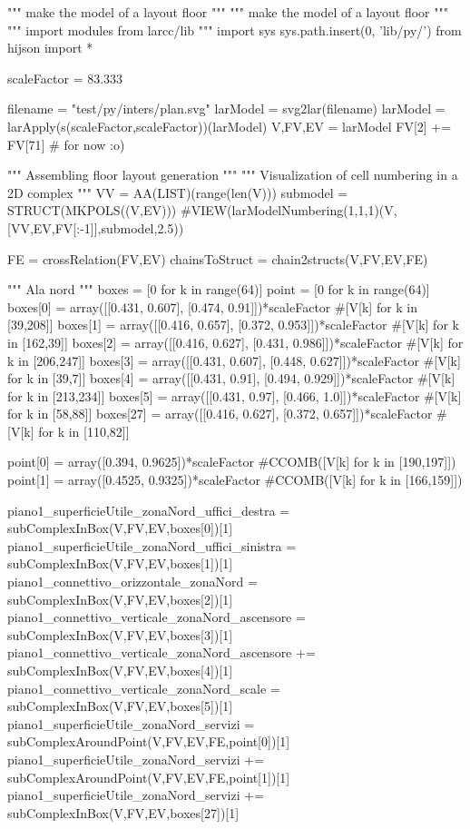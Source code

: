 """ make the model of a layout floor """
""" make the model of a layout floor """
""" import modules from larcc/lib """
import sys
sys.path.insert(0, 'lib/py/')
from hijson import *

scaleFactor = 83.333

filename = "test/py/inters/plan.svg"
larModel = svg2lar(filename)
larModel = larApply(s(scaleFactor,scaleFactor))(larModel)
V,FV,EV = larModel
FV[2] += FV[71]      # for now :o)

""" Assembling floor layout generation """
""" Visualization of cell numbering in a 2D complex """
VV = AA(LIST)(range(len(V)))
submodel = STRUCT(MKPOLS((V,EV)))
#VIEW(larModelNumbering(1,1,1)(V,[VV,EV,FV[:-1]],submodel,2.5))

FE = crossRelation(FV,EV)
chainsToStruct = chain2structs(V,FV,EV,FE)

""" Ala nord """
boxes = [0 for k in range(64)]
point = [0 for k in range(64)]
boxes[0] = array([[0.431, 0.607], [0.474, 0.91]])*scaleFactor #[V[k] for k in [39,208]]
boxes[1] = array([[0.416, 0.657], [0.372, 0.953]])*scaleFactor #[V[k] for k in [162,39]]
boxes[2] = array([[0.416, 0.627], [0.431, 0.986]])*scaleFactor #[V[k] for k in [206,247]]
boxes[3] = array([[0.431, 0.607], [0.448, 0.627]])*scaleFactor #[V[k] for k in [39,7]]
boxes[4] = array([[0.431, 0.91], [0.494, 0.929]])*scaleFactor  #[V[k] for k in [213,234]]
boxes[5] = array([[0.431, 0.97], [0.466, 1.0]])*scaleFactor #[V[k] for k in [58,88]]
boxes[27] = array([[0.416, 0.627], [0.372, 0.657]])*scaleFactor #[V[k] for k in [110,82]]

point[0] = array([0.394, 0.9625])*scaleFactor #CCOMB([V[k] for k in [190,197]])
point[1] = array([0.4525, 0.9325])*scaleFactor #CCOMB([V[k] for k in [166,159]])

piano1_superficieUtile_zonaNord_uffici_destra = subComplexInBox(V,FV,EV,boxes[0])[1]
piano1_superficieUtile_zonaNord_uffici_sinistra = subComplexInBox(V,FV,EV,boxes[1])[1]
piano1_connettivo_orizzontale_zonaNord = subComplexInBox(V,FV,EV,boxes[2])[1]
piano1_connettivo_verticale_zonaNord_ascensore = subComplexInBox(V,FV,EV,boxes[3])[1]
piano1_connettivo_verticale_zonaNord_ascensore += subComplexInBox(V,FV,EV,boxes[4])[1]
piano1_connettivo_verticale_zonaNord_scale = subComplexInBox(V,FV,EV,boxes[5])[1]
piano1_superficieUtile_zonaNord_servizi = subComplexAroundPoint(V,FV,EV,FE,point[0])[1]
piano1_superficieUtile_zonaNord_servizi += subComplexAroundPoint(V,FV,EV,FE,point[1])[1]
piano1_superficieUtile_zonaNord_servizi += subComplexInBox(V,FV,EV,boxes[27])[1]

